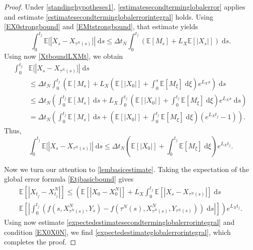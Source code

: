 \documentclass[reqno,12pt]{amsart}
\theoremstyle{plain}%
\theoremstyle{definition}
\begin{document}
\begin{proof}
    Under \cref{standinghypotheses1}, \cref{estimatesecondterminglobalerror} applies and estimate \eqref{estimatesecondterminglobalerrorintegral} holds.
    Using \eqref{EX0strongbound} and \eqref{EMtstrongbound}, that estimate yields
    \[
        \int_0^{t_j} \mathbb{E}[|X_s - X_{\tau^N(s)}]| \;\mathrm{d}s \leq \Delta t_N \int_0^{t_j} (\mathbb{E}[M_s] + L_X\mathbb{E}[|X_s|]) \;\mathrm{d}s.
    \]
    Using now \eqref{XtboundLXMt}, we obtain
    \begin{align*}
        \int_0^{t_j} & \mathbb{E}[|X_s - X_{\tau^N(s)}]| \;\mathrm{d}s \\
        & \leq \Delta t_N \int_0^{t_j} \left(\mathbb{E}[M_s] + L_X\left(\mathbb{E}[|X_0|] + \int_0^s \mathbb{E}[M_\xi]\;\mathrm{d}\xi\right)e^{L_X s} \right)\;\mathrm{d}s \\
        & \leq \Delta t_N \left(\int_0^{t_j} \mathbb{E}[M_s] \;\mathrm{d}s + L_X \int_0^{t_j}\left(\mathbb{E}[|X_0|] + \int_0^{t_j} \mathbb{E}[M_\xi]\;\mathrm{d}\xi\right)e^{L_X s} \;\mathrm{d}s\right) \\
        & = \Delta t_N \left(\int_0^{t_j} \mathbb{E}[M_s] \;\mathrm{d}s + \left(\mathbb{E}[|X_0|] + \int_0^{t_j} \mathbb{E}[M_\xi]\;\mathrm{d}\xi\right)\left(e^{L_X t_j} - 1\right) \right).
    \end{align*}
    Thus,
    \begin{equation}
        \label{expectedestimatesecondterminglobalerrorintegral}
        \int_0^{t_j} \mathbb{E}[|X_s - X_{\tau^N(s)}]| \;\mathrm{d}s \leq \Delta t_N\left(\mathbb{E}[|X_0|] + \int_0^{t_j} \mathbb{E}[M_\xi]\;\mathrm{d}\xi\right)e^{L_X t_j}.
    \end{equation}

    Now we turn our attention to \cref{lembasicestimate}. Taking the expectation of the global error formula \eqref{Etjbasicbound} gives
    \begin{multline*}
        \mathbb{E}\left[|X_{t_j} - X_{t_j}^N|\right] \leq \left( \mathbb{E}\left[|X_0 - X_0^N|\right] + L_X \int_0^{t_j} \mathbb{E}\left[|X_s - X_{\tau^N(s)}|\right] \;\mathrm{d}s \right. \\
        \left. \mathbb{E}\left[\left|\int_0^{t_j} \left( f(s, X_{\tau^N(s)}^N, Y_s) - f(\tau^N(s), X_{\tau^N(s)}^N, Y_{\tau^N(s)}) \right)\;\mathrm{d}s\right|\right]\right) e^{L_X t_j}.
    \end{multline*}
    Using now estimate \eqref{expectedestimatesecondterminglobalerrorintegral} and condition \eqref{EX0X0N}, we find \eqref{expectedestimateglobalerrorintegral}, which completes the proof.
\end{proof}
\end{document}
